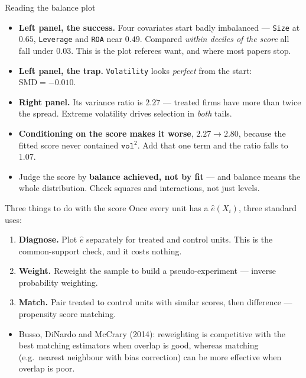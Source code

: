 \documentclass[
  11pt,
  ignorenonframetext,
  aspectratio=169,
]{beamer}
\providecommand{\tightlist}{%
  \setlength{\itemsep}{0pt}\setlength{\parskip}{0pt}}
\begin{document}
\begin{frame}[fragile]{Reading the balance plot}
\protect{}\label{reading-the-balance-plot}
\begin{itemize}
\tightlist
\item
  \textbf{Left panel, the success.} Four covariates start badly
  imbalanced --- \texttt{Size} at \(0.65\), \texttt{Leverage} and
  \texttt{ROA} near \(0.49\). Compared \emph{within deciles of the
  score} all fall under \(0.03\). This is the plot referees want, and
  where most papers stop.
\item
  \textbf{Left panel, the trap.} \texttt{Volatility} looks
  \emph{perfect} from the start: \(\text{SMD} = -0.010\).
\item
  \textbf{Right panel.} Its variance ratio is \(\mathbf{2.27}\) ---
  treated firms have more than twice the spread. Extreme volatility
  drives selection in \emph{both} tails.
\item
  \textbf{Conditioning on the score makes it worse},
  \(2.27 \to \mathbf{2.80}\), because the fitted score never contained
  \(\texttt{vol}^2\). Add that one term and the ratio falls to
  \(\mathbf{1.07}\).
\item
  Judge the score by \textbf{balance achieved, not by fit} --- and
  balance means the whole distribution. Check squares and interactions,
  not just levels.
\end{itemize}
\end{frame}

\begin{frame}{Three things to do with the score}
\protect{}\label{three-things-to-do-with-the-score}
Once every unit has a \(\hat e(X_i)\), three standard uses:

\begin{enumerate}
\tightlist
\item
  \textbf{Diagnose.} Plot \(\hat e\) separately for treated and control
  units. This is the common-support check, and it costs nothing.
\item
  \textbf{Weight.} Reweight the sample to build a pseudo-experiment ---
  inverse probability weighting.
\item
  \textbf{Match.} Pair treated to control units with similar scores,
  then difference --- propensity score matching.
\end{enumerate}

\begin{itemize}
\tightlist
\item
  Busso, DiNardo and McCrary (2014): reweighting is competitive with the
  best matching estimators when overlap is good, whereas matching
  (e.g.~nearest neighbour with bias correction) can be more effective
  when overlap is poor.
\end{itemize}
\end{frame}
\end{document}
